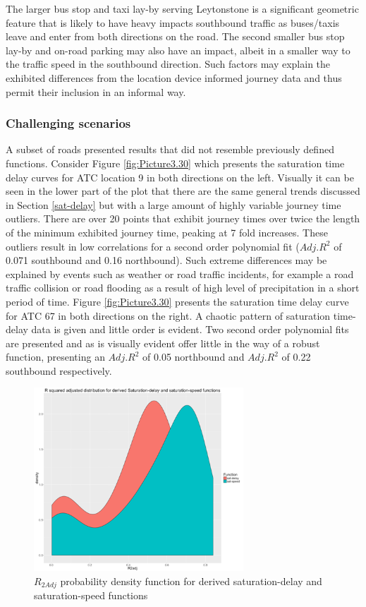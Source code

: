 \documentclass{CUP-JNL-DCE}
\begin{document}
The larger bus stop and taxi lay-by serving Leytonstone is a significant geometric feature that is likely to have heavy impacts southbound traffic as buses/taxis leave and enter from both directions on the road. The second smaller bus stop lay-by and on-road parking may also have an impact, albeit in a smaller way to the traffic speed in the southbound direction. Such factors may explain the exhibited differences from the location device informed journey data and thus permit their inclusion in an informal way.

\subsubsection{Challenging scenarios}

A subset of roads presented results that did not resemble previously defined functions. Consider Figure \ref{fig:Picture3.30} which presents the saturation time delay curves for ATC location 9 in both directions on the left. Visually it can be seen in the lower part of the plot that there are the same general trends discussed in Section \ref{sat-delay} but with a large amount of highly variable journey time outliers. There are over 20 points that exhibit journey times over twice the length of the minimum exhibited journey time, peaking at 7 fold increases. These outliers result in low correlations for a second order polynomial fit ($Adj. R^2$ of 0.071 southbound and 0.16 northbound). Such extreme differences may be explained by events such as weather or road traffic incidents, for example a road traffic collision or road flooding as a result of high level of precipitation in a short period of time. Figure \ref{fig:Picture3.30} presents the saturation time delay curve for ATC 67 in both directions on the right. A chaotic pattern of saturation time-delay data is given and little order is evident. Two second order polynomial fits are presented and as is visually evident offer little in the way of a robust function, presenting an $Adj. R^2$ of 0.05 northbound and $Adj. R^2$ of 0.22 southbound respectively. 

\begin{figure}[htbp!] 
	\centering    
	\includegraphics[width=0.7\textwidth]{Picture28}
	\caption[$R_{2Adj}$ probability density function for derived saturation-delay and saturation-speed functions]{$R_{2Adj}$ probability density function for derived saturation-delay and saturation-speed functions}
	\label{fig:Picture3.28}
\end{figure}
\end{document}
